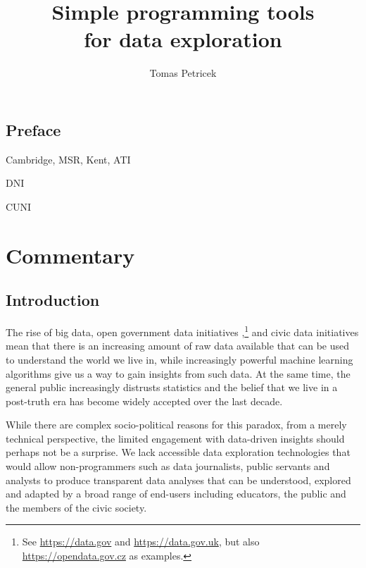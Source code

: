 \documentclass[fleqn,11pt]{report}
\theoremstyle{definition}
\begin{document}
\title{\Huge\textbf{Simple programming tools \\for data exploration}}
\author{Tomas Petricek}
\maketitle

\chapter*{Preface}
\label{ch:preface}

Cambridge, MSR, Kent, ATI

DNI

CUNI

\tableofcontents

\part{Commentary}


\chapter{Introduction}

The rise of big data, open government data initiatives \citep{attard-2015-opengov},\footnote{See
\url{https://data.gov} and \url{https://data.gov.uk}, but also \url{https://opendata.gov.cz} as
examples.} and civic data initiatives mean that there is an increasing amount of raw data available
that can be used to understand the world we live in, while increasingly powerful machine learning
algorithms give us a way to gain insights from such data. At the same time, the general
public increasingly distrusts statistics \citep{davies-2017-statistics} and the belief that we
live in a post-truth era has become widely accepted over the last decade.

While there are complex socio-political reasons for this paradox, from a merely technical
perspective, the limited engagement with data-driven insights should perhaps
not be a surprise. We lack accessible data exploration technologies that would allow
non-programmers such as data journalists, public servants and analysts to produce transparent data
analyses that can be understood, explored and adapted by a broad range of end-users including
educators, the public and the members of the civic society.
\end{document}
